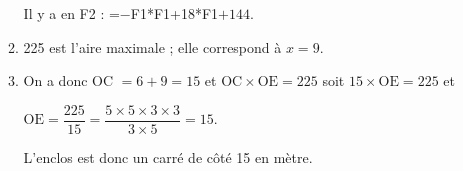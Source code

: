 \begin{enumerate}
\begin{enumerate}
Il y a en F2 : =$-$F1*F1+18*F1$+144$.
		\item %

225 est l'aire maximale  ; elle correspond à $x = 9$.
		\item %
On a donc OC $ = 6 + 9 = 15$ et $\text{OC} \times \text{OE}  = 225$ soit $15 \times \text{OE}  = 225$ et 

$\text{OE} = \dfrac{225}{15} = \dfrac{5\times 5\times  3 \times 3}{3 \times 5} = 15.$

L'enclos est donc un carré de côté 15 en mètre.
\end{enumerate} 
\end{enumerate}		
